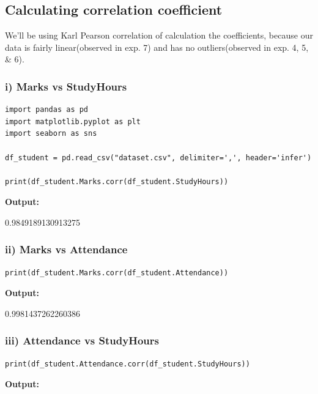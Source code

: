 
\subsection{Calculating correlation coefficient}

We'll be using Karl Pearson correlation of calculation the coefficients, because our data is fairly linear(observed in exp. 7) and has no outliers(observed in exp. 4, 5, \& 6).

\subsubsection*{i) Marks vs StudyHours}

\begin{lstlisting}[style=python]
import pandas as pd 
import matplotlib.pyplot as plt 
import seaborn as sns

df_student = pd.read_csv("dataset.csv", delimiter=',', header='infer')

print(df_student.Marks.corr(df_student.StudyHours))
\end{lstlisting}

\textbf{Output:}

0.9849189130913275

\subsubsection*{ii) Marks vs Attendance}

\begin{lstlisting}[style=python]
print(df_student.Marks.corr(df_student.Attendance))
\end{lstlisting}

\textbf{Output:}

0.9981437262260386

\subsubsection*{iii) Attendance vs StudyHours}

\begin{lstlisting}[style=python]
print(df_student.Attendance.corr(df_student.StudyHours))
\end{lstlisting}

\textbf{Output:}

